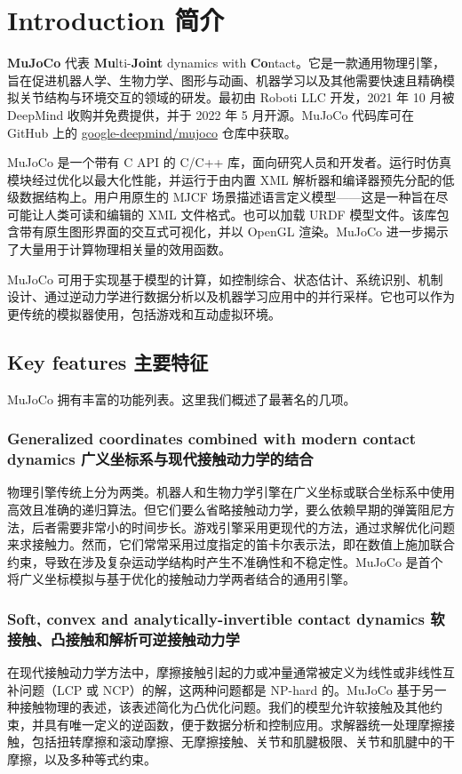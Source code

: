\chapter{Introduction 简介}

\textbf{MuJoCo} 代表 \textbf{Mu}lti-\textbf{Joint} dynamics with \textbf{Co}ntact。它是一款通用物理引擎，旨在促进机器人学、生物力学、图形与动画、机器学习以及其他需要快速且精确模拟关节结构与环境交互的领域的研发。最初由 Roboti LLC 开发，2021 年 10 月被 DeepMind 收购并免费提供，并于 2022 年 5 月开源。MuJoCo 代码库可在 GitHub 上的 \href{https://github.com/google-deepmind/mujoco}{google-deepmind/mujoco} 仓库中获取。

MuJoCo 是一个带有 C API 的 C/C++ 库，面向研究人员和开发者。运行时仿真模块经过优化以最大化性能，并运行于由内置 XML 解析器和编译器预先分配的低级数据结构上。用户用原生的 MJCF 场景描述语言定义模型——这是一种旨在尽可能让人类可读和编辑的 XML 文件格式。也可以加载 URDF 模型文件。该库包含带有原生图形界面的交互式可视化，并以 OpenGL 渲染。MuJoCo 进一步揭示了大量用于计算物理相关量的效用函数。

MuJoCo 可用于实现基于模型的计算，如控制综合、状态估计、系统识别、机制设计、通过逆动力学进行数据分析以及机器学习应用中的并行采样。它也可以作为更传统的模拟器使用，包括游戏和互动虚拟环境。

\section{Key features 主要特征}
MuJoCo 拥有丰富的功能列表。这里我们概述了最著名的几项。

\subsection{Generalized coordinates combined with modern contact dynamics 广义坐标系与现代接触动力学的结合}
物理引擎传统上分为两类。机器人和生物力学引擎在广义坐标或联合坐标系中使用高效且准确的递归算法。但它们要么省略接触动力学，要么依赖早期的弹簧阻尼方法，后者需要非常小的时间步长。游戏引擎采用更现代的方法，通过求解优化问题来求接触力。然而，它们常常采用过度指定的笛卡尔表示法，即在数值上施加联合约束，导致在涉及复杂运动学结构时产生不准确性和不稳定性。MuJoCo 是首个将广义坐标模拟与基于优化的接触动力学两者结合的通用引擎。

\subsection{Soft, convex and analytically-invertible contact dynamics 软接触、凸接触和解析可逆接触动力学}
在现代接触动力学方法中，摩擦接触引起的力或冲量通常被定义为线性或非线性互补问题（LCP 或 NCP）的解，这两种问题都是 NP-hard 的。MuJoCo 基于另一种接触物理的表述，该表述简化为凸优化问题。我们的模型允许软接触及其他约束，并具有唯一定义的逆函数，便于数据分析和控制应用。求解器统一处理摩擦接触，包括扭转摩擦和滚动摩擦、无摩擦接触、关节和肌腱极限、关节和肌腱中的干摩擦，以及多种等式约束。

